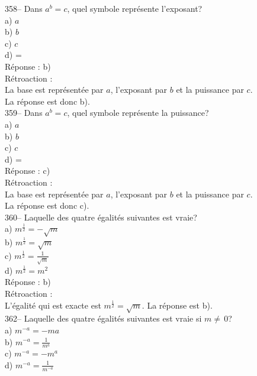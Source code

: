 ﻿\documentclass[letterpaper, 12pt]{article}
\begin{document}
358-- Dans $a^{b}=c$, quel symbole repr\'esente  l'exposant?\\
a) $a$\\
b) $b$\\
c) $c$\\
d) =\\

R\'eponse : b)\\

R\'etroaction : \\
La base est repr\'esent\'ee par $a$, l'exposant par $b$ et la
puissance par $c$.\\
La r\'eponse est donc b).\\

359-- Dans $a^{b}=c$, quel symbole repr\'esente la puissance?\\
a) $a$\\
b) $b$\\
c) $c$\\
d) =\\

R\'eponse : c)\\

R\'etroaction : \\
La base est repr\'esent\'ee par $a$, l'exposant par $b$ et la
puissance par $c$.\\
La r\'eponse est donc c).\\

360-- Laquelle des quatre \'egalit\'es suivantes est vraie?\\
a) $m^{\frac{1}{2}}=-\sqrt{m}$\\
b) $m^{\frac{1}{2}}=\sqrt{m}$\\
c) $m^{\frac{1}{2}}=\frac{1}{\sqrt{m}}$\\
d) $m^{\frac{1}{2}}=m^{2}$\\

R\'eponse : b)\\

R\'etroaction : \\
L'\'egalit\'e qui est exacte est $m^{\frac{1}{2}}=\sqrt{m}$.  La r\'eponse
est b).\\


362-- Laquelle des quatre \'egalit\'es suivantes est vraie si $m\neq\,$0?\\
a) $m^{-a}=-ma$\\[2mm]
b) $m^{-a}=\frac{1}{m^{a}}$\\[2mm]
c) $m^{-a}=-m^{a}$\\[2mm]
d) $m^{-a}=\frac{1}{m^{-a}}$\\
\end{document}
